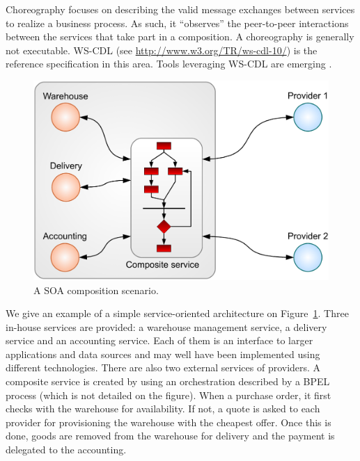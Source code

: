 Choreography focuses on describing the valid message exchanges between services to realize a business process. As such, it ``observes'' the peer-to-peer interactions between the services that take part in a composition. A choreography is generally not executable. WS-CDL (see \url{http://www.w3.org/TR/ws-cdl-10/}) is the reference specification in this area. Tools leveraging WS-CDL are emerging \cite{KangWH07}.\\

\begin{figure}[htbp]
    \centering
    \includegraphics[width=\textwidth]{content/web-services/soa-composition-scenario}
    \caption{A SOA composition scenario.}
    \label{fig:soa-composition-scenario}
\end{figure}

We give an example of a simple service-oriented architecture on Figure~\ref{fig:soa-composition-scenario}. Three in-house services are provided: a warehouse management service, a delivery service and an accounting service. Each of them is an interface to larger applications and data sources and may well have been implemented using different technologies. There are also two external services of providers. A composite service is created by using an orchestration described by a BPEL process (which is not detailed on the figure). When a purchase order, it first checks with the warehouse for availability. If not, a quote is asked to each provider for provisioning the warehouse with the cheapest offer. Once this is done, goods are removed from the warehouse for delivery and the payment is delegated to the accounting.\\

